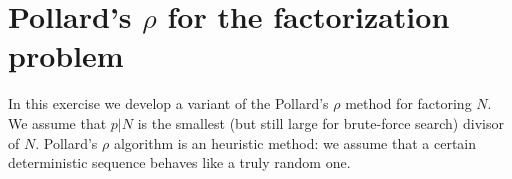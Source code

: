 \documentclass[11pt]{exam}
\theoremstyle{definition}
\begin{document}
{%
			
			

\section{Pollard's $\rho$ for the factorization problem} 
In this exercise we develop a variant of the Pollard's $\rho$ method for factoring $N$. We assume that $p | N $ is the smallest (but still large for brute-force search) divisor of $N$.  Pollard's $\rho$ algorithm is an heuristic method: we assume that a certain deterministic sequence behaves like a truly random one.

}
\end{document}
